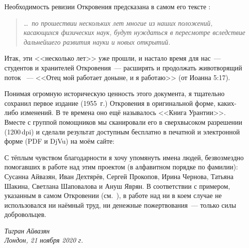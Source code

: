 Необходимость ревизии Откровения предсказана в самом его тексте :
\begin{quote}
\ldots\itshape\ по прошествии нескольких лет многие из наших положений, касающихся физических наук, будут нуждаться в пересмотре вследствие дальнейшего развития науки и новых открытий.
\end{quote}
Итак, эти <<несколько лет>> уже прошли, и настало время для нас~--- студентов и хранителей Откровения~--- расширять и
продолжать животворящий поток ~--- <<Отец мой работает доныне, и я работаю>> (от Иоанна 5:17).

Понимая огромную историческую ценность этого документа,
я тщательно сохранил первое издание (1955~г.) Откровения в оригинальной форме,  каких-либо изменений.
В те времена оно ещё называлось <<Книга Урантии>>.
Вместе с группой помощников мы сканировали его в сверхвысоком разрешении (1200\,dpi) и сделали результат доступным бесплатно
в печатной и электронной форме (PDF и DjVu) на моём сайте:

\begin{center}
\end{center}

С тёплым чувством благодарности я хочу упомянуть имена людей, безвозмездно помогавших в работе над этим проектом
(в алфавитном порядке по фамилии): Сусанна Айвазян, Иван Дехтярёв, Сергей Прокопов, Ирина Чернова, Татьяна Шакина, Светлана Шаповалова и Ануш Яврян.
В соответствии с примером, указанным в самом Откровении (см.~), в работе над
 ни в коем случае не использовался ни наёмный труд, ни денежные пожертвования~--- только
силы добровольцев.


\begin{flushleft}
\itshape
Тигран Айвазян\\
Лондон, 21 ноября 2020 г.\\
\end{flushleft}
